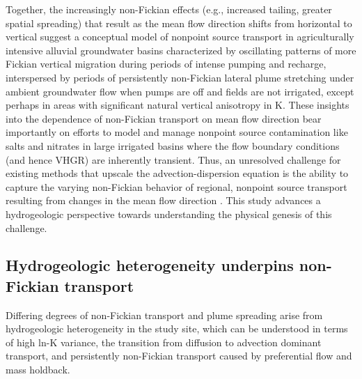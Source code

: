 Together, the increasingly non-Fickian effects (e.g., increased tailing, greater spatial spreading) that result as the mean flow direction shifts from horizontal to vertical suggest a conceptual model of nonpoint source transport in agriculturally intensive alluvial groundwater basins characterized by oscillating patterns of more Fickian vertical migration during periods of intense pumping and recharge, interspersed by periods of persistently non-Fickian lateral plume stretching under ambient groundwater flow when pumps are off and fields are not irrigated, except perhaps in areas with significant natural vertical anisotropy in K. These insights into the dependence of non-Fickian transport on mean flow direction bear importantly on efforts to model and manage nonpoint source contamination like salts \citep{hansen2018quantifying} and nitrates \citep{pasten2014assessment} in large irrigated basins where the flow boundary conditions (and hence VHGR) are inherently transient. Thus, an unresolved challenge for existing methods that upscale the advection-dispersion equation \citep{neuman2009perspective} is the ability to capture the varying non-Fickian behavior of regional, nonpoint source transport resulting from changes in the mean flow direction \citep{guo2020adaptive}. This study advances a hydrogeologic perspective towards understanding the physical genesis of this challenge.




%
%
\subsection{Hydrogeologic heterogeneity underpins non-Fickian transport}
\label{ss_4_2}

Differing degrees of non-Fickian transport and plume spreading arise from hydrogeologic heterogeneity in the study site, which can be understood in terms of high ln-K variance, the transition from diffusion to advection dominant transport, and persistently non-Fickian transport caused by preferential flow and mass holdback.

